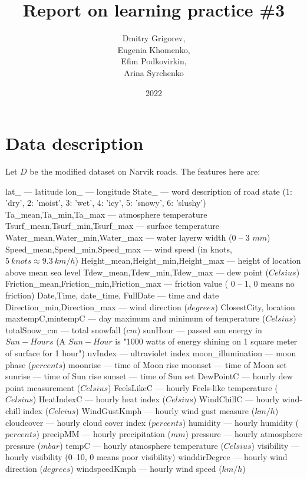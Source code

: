\documentclass[12pt, bachelor, substylefile = algo_title.rtx]{disser}
\theoremstyle{definition}
\begin{document}
\title{Report on learning practice \#3}


\author{Dmitry Grigorev,\\ Eugenia Khomenko,\\ Efim Podkovirkin,\\ Arina Syrchenko}

\date{2022}

\maketitle

\tableofcontents

\section{Data description}

Let $D$ be the modified dataset on Narvik roads. The features here are:

\begin{outline}
\1lat\_ — latitude
\1 lon\_ — longitude
\1 State\_ — word description of road state (1: 'dry', 2: 'moist', 3: 'wet', 4: 'icy', 5: 'snowy', 6: 'slushy')
\1 Ta\_mean,Ta\_min,Ta\_max — atmosphere temperature
\1 Tsurf\_mean,Tsurf\_min,Tsurf\_max — surface temperature
\1 Water\_mean,Water\_min,Water\_max — water layerw width (0 -- 3 $mm$)
\1 Speed\_mean,Speed\_min,Speed\_max — wind speed (in knots, $5\ knots \approx 9.3\ km/h$)
\1 Height\_mean,Height\_min,Height\_max — height of location above mean sea level
\1 Tdew\_mean,Tdew\_min,Tdew\_max — dew point ($Celsius$)
\1 Friction\_mean,Friction\_min,Friction\_max — friction value ( 0 -- 1, 0 means no friction)
\1 Date,Time, date\_time, FullDate — time and date
\1 Direction\_min,Direction\_max — wind direction ($degrees$)
\1 ClosestCity, location
\1 maxtempC,mintempC — day maximum and minimum of temperature ($Celsius$)
\1 totalSnow\_cm — total snowfall ($cm$)
\1 sunHour — passed sun energy in $Sun-Hours$ (A $Sun-Hour$ is "1000 watts of energy shining on 1 square meter of surface for 1 hour")
\1 uvIndex — ultraviolet index
\1 moon\_illumination — moon phase ($percents$)
\1 moonrise — time of Moon rise
\1 moonset — time of Moon set
\1 sunrise — time of Sun rise
\1 sunset — time of Sun set
\1 DewPointC — hourly dew point measurement ($Celsius$)
\1 FeelsLikeC — hourly Feels-like temperature ($Celsius$)
\1 HeatIndexC — hourly heat index ($Celsius$)
\1 WindChillC — hourly wind-chill index ($Celcius$) 
\1 WindGustKmph — hourly wind gust measure ($km/h$)
\1 cloudcover — hourly cloud cover index ($percents$)
\1 humidity — hourly humidity ($percents$)
\1 precipMM — hourly precipitation ($mm$)
\1 pressure — hourly atmosphere pressure ($mbar$)
\1 tempC — hourly atmosphere temperature ($Celsius$)
\1 visibility — hourly visibility (0--10, 0 means poor visibility)
\1 winddirDegree — hourly wind direction ($degrees$)
\1 windspeedKmph — hourly wind speed ($km/h$)
\end{outline}
\end{document}
